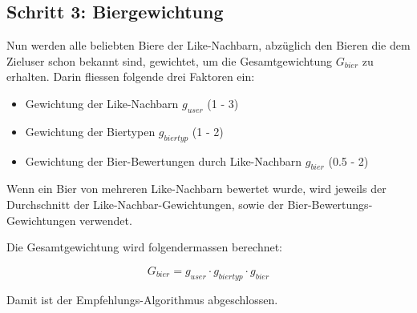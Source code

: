 \documentclass[10pt,a4paper]{scrartcl}
\begin{document}
\subsection{Schritt 3: Biergewichtung}

Nun werden alle beliebten Biere der Like-Nachbarn, abzüglich den Bieren die dem Zieluser schon bekannt sind,
gewichtet, um die Gesamtgewichtung $G_{bier}$ zu erhalten. Darin fliessen folgende drei Faktoren
ein:

\begin{itemize}
	\item Gewichtung der Like-Nachbarn $g_{user}$ (1 - 3)
	\item Gewichtung der Biertypen $g_{biertyp}$ (1 - 2)
	\item Gewichtung der Bier-Bewertungen durch Like-Nachbarn $g_{bier}$ (0.5 - 2)
\end{itemize}

Wenn ein Bier von mehreren Like-Nachbarn bewertet wurde, wird jeweils der Durchschnitt der
Like-Nachbar-Gewichtungen, sowie der Bier-Bewertungs-Gewichtungen verwendet.

Die Gesamtgewichtung wird folgendermassen berechnet:

$$G_{bier} = g_{user} \cdot g_{biertyp} \cdot g_{bier}$$

Damit ist der Empfehlungs-Algorithmus abgeschlossen.
\end{document}
